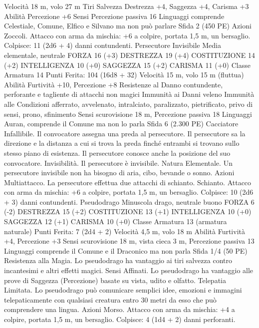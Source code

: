 \begin{multicols}{2}
Velocità 18 m, volo 27 m
Tiri Salvezza Destrezza +4, Saggezza +4, Carisma +3
Abilità Percezione +6
Sensi Percezione passiva 16
Linguaggi comprende Celestiale, Comune, Elfico e Silvano ma
non può parlare
Sfida 2 (450 PE)
Azioni
Zoccoli. Attacco con arma da mischia: +6 a colpire, portata 1,5
m, un bersaglio.
Colpisce: 11 (2d6 + 4) danni contundenti.
Persecutore Invisibile
Media elementale, neutrale
FORZA 16 (+3)
DESTREZZA 19 (+4)
COSTITUZIONE 14 (+2)
INTELLIGENZA 10 (+0)
SAGGEZZA 15 (+2)
CARISMA 11 (+0)
Classe Armatura 14
\hspace*{0pt}\hfill{Punti Ferita}: 104 (16d8 + 32)
Velocità 15 m, volo 15 m (fluttua)
Abilità Furtività +10, Percezione +8
Resistenze al Danno contundente, perforante e tagliente di
attacchi non magici
Immunità ai Danni veleno
Immunità alle Condizioni afferrato, avvelenato, intralciato,
paralizzato, pietrificato, privo di sensi, prono, sfinimento
Sensi scurovisione 18 m, Percezione passiva 18
Linguaggi Auran, comprende il Comune ma non lo parla
Sfida 6 (2.300 PE)
Cacciatore Infallibile. Il convocatore assegna una preda al
persecutore. Il persecutore sa la direzione e la distanza a cui si
trova la preda finché entrambi si trovano sullo stesso piano di
esistenza. Il persecutore conosce anche la posizione del suo
convocatore.
Invisibilità. Il persecutore è invisibile.
Natura Elementale. Un persecutore invisibile non ha bisogno di
aria, cibo, bevande o sonno.
Azioni
Multiattacco. La persecutore effettua due attacchi di schianto.
Schianto. Attacco con arma da mischia: +6 a colpire, portata 1,5
m, un bersaglio.
Colpisce: 10 (2d6 + 3) danni contundenti.
Pseudodrago
Minuscola drago, neutrale buono
FORZA 6 (-2)
DESTREZZA 15 (+2)
COSTITUZIONE 13 (+1)
INTELLIGENZA 10 (+0)
SAGGEZZA 12 (+1)
CARISMA 10 (+0)
Classe Armatura 13 (armatura naturale)
\hspace*{0pt}\hfill{Punti Ferita}: 7 (2d4 + 2)
Velocità 4,5 m, volo 18 m
Abilità Furtività +4, Percezione +3
Sensi scurovisione 18 m, vista cieca 3 m, Percezione passiva 13
Linguaggi comprende il Comune e il Draconico ma non parla
Sfida 1/4 (50 PE)
Resistenza alla Magia. Lo pseudodrago ha vantaggio ai tiri
salvezza contro incantesimi e altri effetti magici.
Sensi Affinati. Lo pseudodrago ha vantaggio alle prove di
Saggezza (Percezione) basate su vista, udito e olfatto.
Telepatia Limitata. Lo pseudodrago può comunicare semplici
idee, emozioni e immagini telepaticamente con qualsiasi creatura
entro 30 metri da esso che può comprendere una lingua.
Azioni
Morso. Attacco con arma da mischia: +4 a colpire, portata 1,5
m, un bersaglio.
Colpisce: 4 (1d4 + 2) danni perforanti.

\end{multicols}
